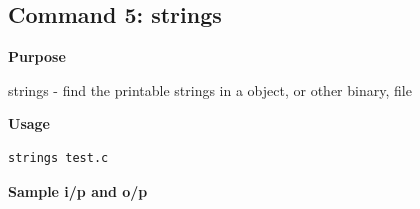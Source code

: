 \subsection{Command 5: strings} 
\textbf{Purpose}
\begin{flushleft}
       strings - find the printable strings in a object, or other binary, file
\end{flushleft}
\textbf{Usage}
\begin{verbatim}
strings test.c
\end{verbatim}
\textbf{Sample i/p and o/p}
\begin{figure}[H] 
\end{figure}
